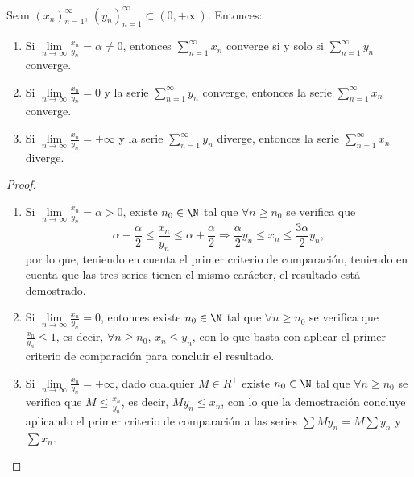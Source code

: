 \begin{theorem}
	Sean \((x_n)^{\infty}_{n=1} \), \((y_n)^{\infty}_{n=1} \subset (0,+\infty) \). Entonces:
	\begin{enumerate}
		\item Si \(\lim\limits_{n \to \infty} \frac{x_n }{y_n } = \alpha \neq 0 \), entonces \(\sum_{n=1}^{\infty} x_n \) converge si y solo si \(\sum_{n=1}^{\infty} y_n \) converge.
		\item Si \(\lim\limits_{n \to \infty} \frac{x_n }{y_n }= 0 \) y la serie \(\sum_{n=1}^{\infty} y_n \) converge, entonces la serie \(\sum_{n =1}^{\infty} x_n \) converge.
		\item Si \(\lim\limits_{n \to \infty} \frac{x_n }{y_n }= + \infty \) y la serie \(\sum_{n =1}^{\infty} y_n \) diverge, entonces la serie \(\sum_{n =1}^{\infty} x_n \) diverge.
	\end{enumerate}
\end{theorem}
\begin{proof}

	\begin{enumerate}
		\item Si \(\lim\limits_{n \to \infty} \frac{x_n }{y_n } = \alpha > 0\), existe \(n_0 \in \N\) tal que \(\forall n \geq n_0\) se verifica que
		      \[
			      \alpha - \frac{\alpha}{2} \leq \frac{x_n }{y_n } \leq \alpha + \frac{\alpha}{2} \Rightarrow \frac{\alpha}{2} y_n \leq x_n \leq \frac{3\alpha}{2} y_n,
		      \]
		      por lo que, teniendo en cuenta el primer criterio de comparación, teniendo en cuenta que las tres series tienen el mismo carácter, el resultado está demostrado. 
		\item Si \(\lim\limits_{n \to \infty} \frac{x_n }{y_n } = 0\), entonces existe \(n_0 \in \N\) tal que \(\forall n \geq n_0 \) se verifica que \(\frac{x_n }{y_n} \leq 1\), es decir, \(\forall n \geq n_0\), \(x_n \leq y_n\), con lo que basta con aplicar el primer criterio de comparación para concluir el resultado.
		\item Si \(\lim\limits_{n \to \infty} \frac{x_n }{y_n } = +\infty\), dado cualquier \(M \in R^{+}\) existe \(n_0 \in \N \) tal que \(\forall n \geq  n_0\) se verifica que \(M \leq \frac{x_n }{y_n }\), es decir, \(My_n \leq x_n \), con lo que la demostración concluye aplicando el primer criterio de comparación a las series \(\sum M y_n = M \sum y_n \) y \(\sum x_n\).
	\end{enumerate}
\end{proof}
